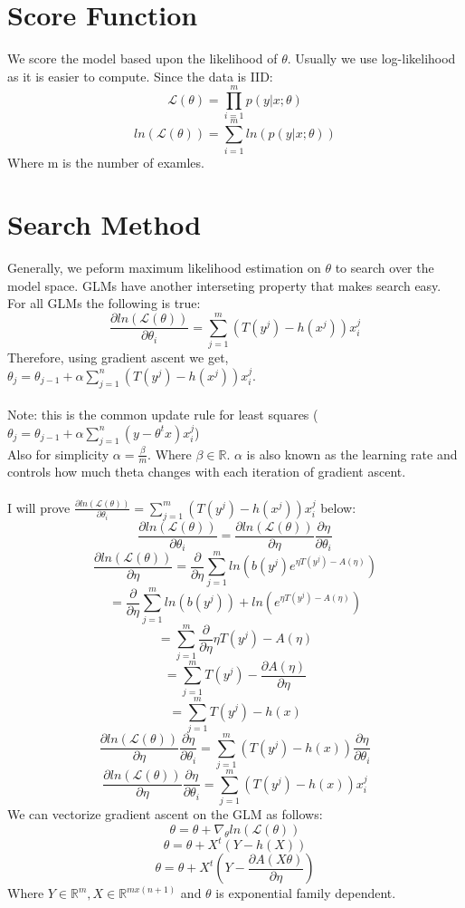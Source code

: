 \documentclass{article}
\newcommand{\fancyL}{\mathcal{L}}
\newcommand{\R}{\mathbb{R}}
\newcommand{\pard}[2]{\frac{\partial {#1}}{\partial {#2}}}
\begin{document}
\section{Score Function}

We score the model based upon the likelihood of $\theta$. Usually we use log-likelihood as it is easier to compute. 
Since the data is IID:\\

$$\fancyL(\theta) = \prod_{i=1}^{m} p(y|x;\theta)$$
$$ln(\fancyL(\theta)) = \sum_{i=1}^{m} ln(p(y|x;\theta))$$
Where m is the number of examles.

\section{Search Method}

Generally, we peform maximum likelihood estimation on $\theta$ to search over the model space. 
GLMs have another interseting property that makes search easy. For all GLMs the following is true:
$$\pard{ln(\fancyL(\theta))}{\theta_i} = \sum_{j=1}^{m} (T(y^j) - h(x^j))x^j_i$$
Therefore, using gradient ascent we get, $\theta_j = \theta_{j-1} + \alpha \sum_{j=1}^{n} (T(y^j) - h(x^j))x^j_i$.\\\\
Note: this is the common update rule for least squares  ($\theta_j = \theta_{j-1}  + \alpha \sum_{j=1}^{n} (y- \theta^t x)x^j_i$)\\
Also for simplicity $ \alpha = \frac{\beta}{m}$. Where $\beta \in \R$. $\alpha$ is also known as the learning rate and controls how much theta changes with 
each iteration of gradient ascent. 
\\\\
I will prove $\pard{ln(\fancyL(\theta))}{\theta_i} = \sum_{j=1}^{m} (T(y^j) - h(x^j))x^j_i$ below:
$$\pard{ln(\fancyL(\theta))}{\theta_i} = \pard{ln(\fancyL(\theta))}{\eta} \pard{\eta}{\theta_i}$$
$$\pard{ln(\fancyL(\theta))}{\eta}  =  \pard{}{\eta} \sum_{j=1}^{m} ln(b(y^j)e^{\eta T(y^j) - A(\eta)})$$
$$ = \pard{}{\eta} \sum_{j=1}^{m} ln(b(y^j)) + ln(e^{\eta T(y^j) - A(\eta)})$$
$$ =  \sum_{j=1}^{m} \pard{}{\eta} {\eta T(y^j) - A(\eta)}$$
$$ =  \sum_{j=1}^{m} {T(y^j) - \pard{A(\eta)}{\eta}}$$
$$ =  \sum_{j=1}^{m} {T(y^j) - h(x)}$$
$$\pard{ln(\fancyL(\theta))}{\eta} \pard{\eta}{\theta_i} = \sum_{j=1}^{m} ({T(y^j) - h(x)}) \pard{\eta}{\theta_i} $$
$$\pard{ln(\fancyL(\theta))}{\eta} \pard{\eta}{\theta_i} = \sum_{j=1}^{m} ({T(y^j) - h(x)}) x^j_i $$
We can vectorize gradient ascent on the GLM as follows:
$$\theta =  \theta + \nabla_{\theta} ln(\fancyL(\theta))$$
$$\theta =  \theta + X^t(Y-h(X))$$
$$\theta =  \theta + X^t(Y-\pard{A(X\theta)}{\eta})$$
Where $Y \in \R^{m}, X \in \R^{m x (n+1)}$ and $\theta$ is exponential family dependent. 
\end{document}

